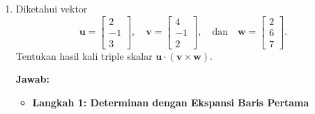 \documentclass[10pt,a4paper]{article}
\begin{document}
\begin{enumerate}
\begin{itemize}
\item \textbf{Langkah 2: Hitung Ketiga Minor}

Setiap determinan $2 \times 2$ dihitung dengan $ad - bc$:
\begin{align}
\mathbf{u} \times \mathbf{v} &= (12 - 0)\mathbf{i} - (-28 - 2)\mathbf{j} + (0 - 6)\mathbf{k} \nonumber \\
&= 12\mathbf{i} + 30\mathbf{j} - 6\mathbf{k} = (12, 30, -6)
\end{align}

\item \textbf{Langkah 3: Cek Tegak Lurus}

Hasil kali titik $\mathbf{w} = (12, 30, -6)$ dengan kedua vektor asal harus nol:
\begin{align}
\mathbf{u} \cdot \mathbf{w} &= (-7)(12) + (3)(30) + (1)(-6) = -84 + 90 - 6 = 0 \\
\mathbf{v} \cdot \mathbf{w} &= (2)(12) + (0)(30) + (4)(-6) = 24 + 0 - 24 = 0
\end{align}
Jadi vektor yang tegak lurus terhadap $\mathbf{u}$ dan $\mathbf{v}$ adalah
\[
\mathbf{u} \times \mathbf{v} = (12, 30, -6) = 6\,(2, 5, -1).
\]
Setiap kelipatan $k(2, 5, -1)$ dengan $k \neq 0$ juga tegak lurus terhadap $\mathbf{u}$ dan $\mathbf{v}$, karena mengalikan dengan skalar hanya mengubah panjang (dan mungkin membalik arah), bukan garis kerjanya.
\end{itemize}

\item Diketahui vektor
\[
\mathbf{u} = \begin{bmatrix} 2 \\ -1 \\ 3 \end{bmatrix}, \quad
\mathbf{v} = \begin{bmatrix} 4 \\ -1 \\ 2 \end{bmatrix}, \quad \text{dan} \quad
\mathbf{w} = \begin{bmatrix} 2 \\ 6 \\ 7 \end{bmatrix}.
\]
Tentukan hasil kali triple skalar $\mathbf{u} \cdot (\mathbf{v} \times \mathbf{w})$.

\textbf{Jawab:}
\begin{itemize}
\item \textbf{Langkah 1: Determinan dengan Ekspansi Baris Pertama}


\end{itemize}
\end{enumerate}
\end{document}
